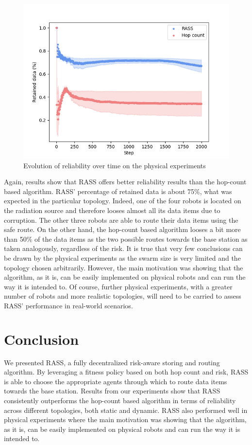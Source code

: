 \begin{figure}[h]
	\centering
    \includegraphics[width=0.90\columnwidth]{images/reliability.png}
    \caption{Evolution of reliability over time on the physical experiments}
    \label{results:physicalRelaibility}
\end{figure}


Again, results show that RASS offers better reliability results than the hop-count based algorithm. RASS' percentage of retained data is about 75\%, what was expected in the particular topology. Indeed, one of the four robots is located on the radiation source and therefore looses almost all its data items due to corruption. The other three robots are able to route their data items using the safe route. On the other hand, the hop-count based algorithm looses a bit more than 50\% of the data items as the two possible routes towards the base station as taken analogously, regardless of the risk. It is true that very few conclusions can be drawn by the physical experiments as the swarm size is very limited and the topology chosen arbitrarily. However, the main motivation was showing that the algorithm, as it is, can be easily implemented on physical robots and can run the way it is intended to. Of course, further physical experiments, with a greater number of robots and more realistic topologies, will need to be carried to assess RASS' performance in real-world scenarios.

\section{Conclusion}

We presented RASS, a fully decentralized risk-aware storing and routing algorithm. By leveraging a fitness policy based on both hop count and risk, RASS is able to choose the appropriate agents through which to route data items towards the base station. Results from our experiments show that RASS consistently outperforms the hop-count based algorithm in terms of reliability across different topologies, both static and dynamic. RASS also performed well in physical experiments where the main motivation was showing that the algorithm, as it is, can be easily implemented on physical robots and can run the way it is intended to.


